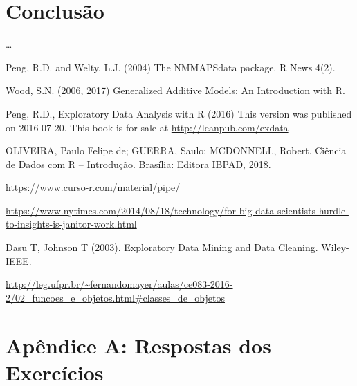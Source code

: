 \documentclass[a4paper]{book}
\begin{document}
\hypertarget{summary}{%
\chapter{Conclusão}\label{summary}}

\ldots{}

Peng, R.D. and Welty, L.J. (2004) The NMMAPSdata package. R News 4(2).

Wood, S.N. (2006, 2017) Generalized Additive Models: An Introduction with R.

Peng, R.D., Exploratory Data Analysis with R (2016) This version was published on 2016-07-20. This book is for sale at \url{http://leanpub.com/exdata}

OLIVEIRA, Paulo Felipe de; GUERRA, Saulo; MCDONNELL, Robert. Ciência de Dados com R -- Introdução. Brasília: Editora IBPAD, 2018.

\url{https://www.curso-r.com/material/pipe/}

\url{https://www.nytimes.com/2014/08/18/technology/for-big-data-scientists-hurdle-to-insights-is-janitor-work.html}

Dasu T, Johnson T (2003). Exploratory Data Mining and Data Cleaning. Wiley-IEEE.

\url{http://leg.ufpr.br/~fernandomayer/aulas/ce083-2016-2/02_funcoes_e_objetos.html\#classes_de_objetos}

\hypertarget{apuxeandice-a-respostas-dos-exercuxedcios}{%
\chapter*{Apêndice A: Respostas dos Exercícios}\label{apuxeandice-a-respostas-dos-exercuxedcios}}


\end{document}
